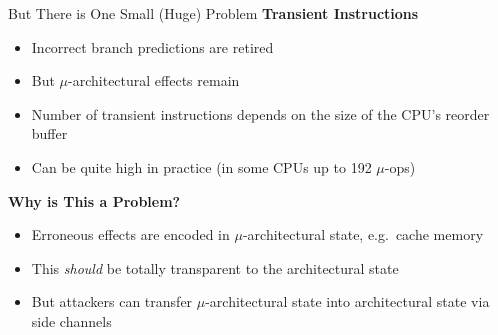 \documentclass[10pt, dvipsnames, aspectratio=169]{beamer}
\begin{document}
\begin{frame}[c]{But There is One Small (Huge) Problem}{}
  {\bf Transient Instructions}
  \begin{itemize}
    \item Incorrect branch predictions are retired
    \item But $\mu$-architectural effects remain
    \item Number of transient instructions depends on the size of the CPU's reorder buffer
    \item Can be quite high in practice (in some CPUs up to 192 $\mu$-ops)
  \end{itemize}

  \vfill
  {\bf Why is This a Problem?}
  \begin{itemize}
    \item Erroneous effects are encoded in $\mu$-architectural state, e.g.~cache memory
    \item This \textit{should} be totally transparent to the architectural state
    \item But attackers can transfer $\mu$-architectural state into architectural state via side channels
  \end{itemize}


\end{frame}
\end{document}
